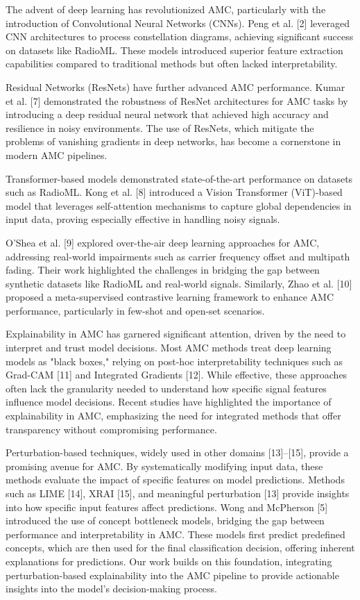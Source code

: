 \documentclass{ELSP}
\begin{document}
The advent of deep learning has revolutionized AMC, particularly with the introduction of Convolutional Neural Networks (CNNs). Peng et al. [2] leveraged CNN architectures to process constellation diagrams, achieving significant success on datasets like RadioML. These models introduced superior feature extraction capabilities compared to traditional methods but often lacked interpretability.

Residual Networks (ResNets) have further advanced AMC performance. Kumar et al. [7] demonstrated the robustness of ResNet architectures for AMC tasks by introducing a deep residual neural network that achieved high accuracy and resilience in noisy environments. The use of ResNets, which mitigate the problems of vanishing gradients in deep networks, has become a cornerstone in modern AMC pipelines.

Transformer-based models demonstrated state-of-the-art performance on datasets such as RadioML. Kong et al. [8] introduced a Vision Transformer (ViT)-based model that leverages self-attention mechanisms to capture global dependencies in input data, proving especially effective in handling noisy signals.

O'Shea et al. [9] explored over-the-air deep learning approaches for AMC, addressing real-world impairments such as carrier frequency offset and multipath fading. Their work highlighted the challenges in bridging the gap between synthetic datasets like RadioML and real-world signals. Similarly, Zhao et al. [10] proposed a meta-supervised contrastive learning framework to enhance AMC performance, particularly in few-shot and open-set scenarios.

Explainability in AMC has garnered significant attention, driven by the need to interpret and trust model decisions. Most AMC methods treat deep learning models as "black boxes," relying on post-hoc interpretability techniques such as Grad-CAM [11] and Integrated Gradients [12]. While effective, these approaches often lack the granularity needed to understand how specific signal features influence model decisions. Recent studies have highlighted the importance of explainability in AMC, emphasizing the need for integrated methods that offer transparency without compromising performance.

Perturbation-based techniques, widely used in other domains [13]–[15], provide a promising avenue for AMC. By systematically modifying input data, these methods evaluate the impact of specific features on model predictions. Methods such as LIME [14], XRAI [15], and meaningful perturbation [13] provide insights into how specific input features affect predictions. Wong and McPherson [5] introduced the use of concept bottleneck models, bridging the gap between performance and interpretability in AMC. These models first predict predefined concepts, which are then used for the final classification decision, offering inherent explanations for predictions. Our work builds on this foundation, integrating perturbation-based explainability into the AMC pipeline to provide actionable insights into the model's decision-making process.
\end{document}

